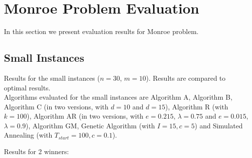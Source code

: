 \newpage

\section{Monroe Problem Evaluation}

In this section we present evaluation results for Monroe problem.

\subsection{Small Instances}

Results for the small instances ($n = 30$, $m = 10$). Results are compared to optimal results.
\\

Algorithms evaluated for the small instances are Algorithm A, Algorithm B, Algorithm C (in two versions, with $d = 10$ and $d = 15$), Algorithm R (with $k = 100$), Algorithm AR (in two versions, with $e = 0.215$, $\lambda = 0.75$ and $e = 0.015$, $\lambda = 0.9$), Algorithm GM, Genetic Algorithm (with $I = 15, c = 5$) and Simulated Annealing (with $T_{start} = 100, c = 0.1$).
\\

\newpage

Results for 2 winners:
\\

